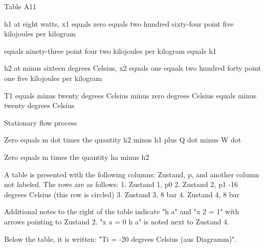 Table A11

h1 at eight watts, x1 equals zero equals two hundred sixty-four point five kilojoules per kilogram

equals ninety-three point four two kilojoules per kilogram equals h1

h2 at minus sixteen degrees Celsius, x2 equals one equals two hundred forty point one five kilojoules per kilogram

T1 equals minus twenty degrees Celsius minus zero degrees Celsius equals minus twenty degrees Celsius

Stationary flow process

Zero equals m dot times the quantity h2 minus h1 plus Q dot minus W dot

Zero equals m times the quantity ha minus h2

A table is presented with the following columns: Zustand, p, and another column not labeled. The rows are as follows:
1. Zustand 1, p0
2. Zustand 2, p1 -16 degrees Celsius (this row is circled)
3. Zustand 3, 8 bar
4. Zustand 4, 8 bar

Additional notes to the right of the table indicate "h a" and "x 2 = 1" with arrows pointing to Zustand 2. "x a = 0 h a" is noted next to Zustand 4.

Below the table, it is written: "Ti = -20 degrees Celsius (aus Diagramm)".